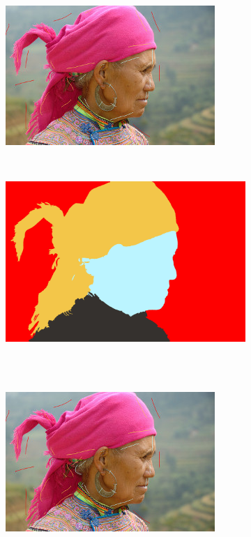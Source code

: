 \begin{figure}[htb]
\begin{subfigure}{0.4\textwidth}
 \end{subfigure}
 \\~\\
 \begin{subfigure}{0.4\textwidth}	
\includegraphics[width=\textwidth]{images/evaluation/010_seeds2.jpg}
 \end{subfigure}
 ~
 \begin{subfigure}{0.4\textwidth}	
\includegraphics[width=\textwidth]{images/evaluation/010_res2.jpg}
 \end{subfigure}
 \\~\\
 \begin{subfigure}{0.4\textwidth}	
\includegraphics[width=\textwidth]{images/evaluation/010_seeds3.jpg}

\end{subfigure}
\end{figure}
